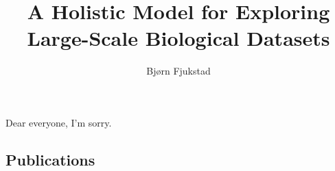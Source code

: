 \documentclass[USenglish,phd]{uit-thesis}
\begin{document}
 

\title{A Holistic Model for Exploring Large-Scale Biological Datasets}
\author{Bjørn Fjukstad}
\maketitle

\begin{dedication}
    Dear everyone, I'm sorry.
\end{dedication}

\frontmatter
 
 

\tableofcontents
\mainmatter
 

\appendix
\begin{appendix}
    \chapter{Publications}
\end{appendix}
\end{document}
